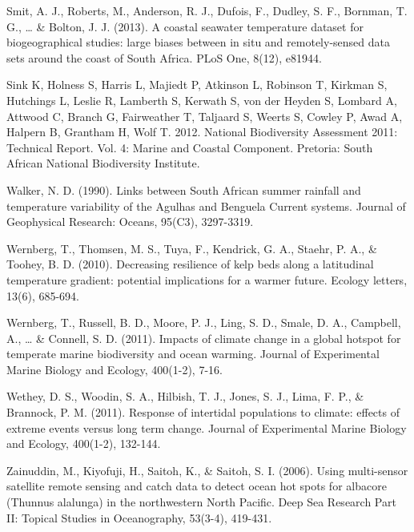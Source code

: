 \documentclass[12pt,]{article}
\begin{document}
Smit, A. J., Roberts, M., Anderson, R. J., Dufois, F., Dudley, S. F.,
Bornman, T. G., \ldots{} \& Bolton, J. J. (2013). A coastal seawater
temperature dataset for biogeographical studies: large biases between in
situ and remotely-sensed data sets around the coast of South Africa.
PLoS One, 8(12), e81944.

Sink K, Holness S, Harris L, Majiedt P, Atkinson L, Robinson T, Kirkman
S, Hutchings L, Leslie R, Lamberth S, Kerwath S, von der Heyden S,
Lombard A, Attwood C, Branch G, Fairweather T, Taljaard S, Weerts S,
Cowley P, Awad A, Halpern B, Grantham H, Wolf T. 2012. National
Biodiversity Assessment 2011: Technical Report. Vol. 4: Marine and
Coastal Component. Pretoria: South African National Biodiversity
Institute.

Walker, N. D. (1990). Links between South African summer rainfall and
temperature variability of the Agulhas and Benguela Current systems.
Journal of Geophysical Research: Oceans, 95(C3), 3297-3319.

Wernberg, T., Thomsen, M. S., Tuya, F., Kendrick, G. A., Staehr, P. A.,
\& Toohey, B. D. (2010). Decreasing resilience of kelp beds along a
latitudinal temperature gradient: potential implications for a warmer
future. Ecology letters, 13(6), 685-694.

Wernberg, T., Russell, B. D., Moore, P. J., Ling, S. D., Smale, D. A.,
Campbell, A., \ldots{} \& Connell, S. D. (2011). Impacts of climate
change in a global hotspot for temperate marine biodiversity and ocean
warming. Journal of Experimental Marine Biology and Ecology, 400(1-2),
7-16.

Wethey, D. S., Woodin, S. A., Hilbish, T. J., Jones, S. J., Lima, F. P.,
\& Brannock, P. M. (2011). Response of intertidal populations to
climate: effects of extreme events versus long term change. Journal of
Experimental Marine Biology and Ecology, 400(1-2), 132-144.

Zainuddin, M., Kiyofuji, H., Saitoh, K., \& Saitoh, S. I. (2006). Using
multi-sensor satellite remote sensing and catch data to detect ocean hot
spots for albacore (Thunnus alalunga) in the northwestern North Pacific.
Deep Sea Research Part II: Topical Studies in Oceanography, 53(3-4),
419-431.
\end{document}
